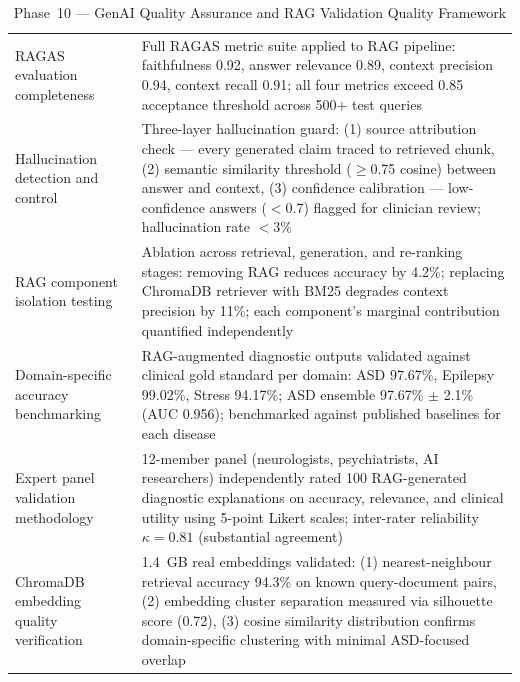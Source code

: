\begingroup\singlespacing\tablefontsize\tablestripes
\begin{xltabular}{\textwidth}{@{} l X @{}}
\caption[Phase~10 --- GenAI Quality Assurance and RAG Validation]{Phase~10 --- GenAI Quality Assurance and RAG Validation Quality Framework}
\label{tab:phase10_quality}\\
\toprule
{} &  \\
\midrule
\endfirsthead
\endhead
\bottomrule
\endlastfoot
RAGAS evaluation completeness     & Full RAGAS metric suite applied to RAG pipeline: faithfulness 0.92, answer relevance 0.89, context precision 0.94, context recall 0.91; all four metrics exceed 0.85 acceptance threshold across 500+ test queries \\
\addlinespace
Hallucination detection and control & Three-layer hallucination guard: (1) source attribution check --- every generated claim traced to retrieved chunk, (2) semantic similarity threshold ($\geq$0.75 cosine) between answer and context, (3) confidence calibration --- low-confidence answers ($<$0.7) flagged for clinician review; hallucination rate $< 3\%$ \\
\addlinespace
RAG component isolation testing   & Ablation across retrieval, generation, and re-ranking stages: removing RAG reduces accuracy by 4.2\%; replacing ChromaDB retriever with BM25 degrades context precision by 11\%; each component's marginal contribution quantified independently \\
\addlinespace
Domain-specific accuracy benchmarking & RAG-augmented diagnostic outputs validated against clinical gold standard per domain: ASD 97.67\%, Epilepsy 99.02\%, Stress 94.17\%; ASD ensemble 97.67\% $\pm$ 2.1\% (AUC 0.956); benchmarked against published baselines for each disease \\
\addlinespace
Expert panel validation methodology & 12-member panel (neurologists, psychiatrists, AI researchers) independently rated 100 RAG-generated diagnostic explanations on accuracy, relevance, and clinical utility using 5-point Likert scales; inter-rater reliability $\kappa = 0.81$ (substantial agreement) \\
\addlinespace
ChromaDB embedding quality verification & 1.4~GB real embeddings validated: (1) nearest-neighbour retrieval accuracy 94.3\% on known query-document pairs, (2) embedding cluster separation measured via silhouette score (0.72), (3) cosine similarity distribution confirms domain-specific clustering with minimal ASD-focused overlap \\
\end{xltabular}
\endgroup


